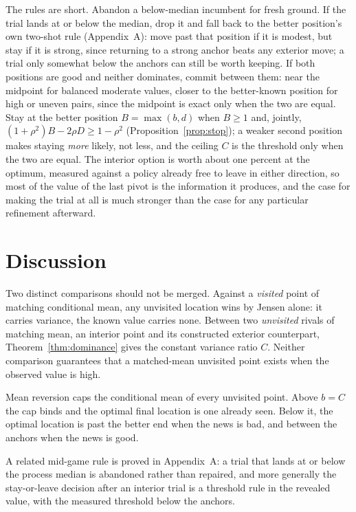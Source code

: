 \documentclass[11pt]{article}
\theoremstyle{itheads}
\begin{document}
The rules are short. Abandon a below-median incumbent for fresh
ground. If the trial lands at or below the median, drop it and fall
back to the better position's own two-shot rule (Appendix~A): move
past that position if it is modest, but stay if it is strong, since
returning to a strong anchor beats any exterior move; a trial only
somewhat below the anchors can still be worth keeping. If both
positions are good and neither dominates, commit between them: near
the midpoint for balanced moderate values, closer to the better-known
position for high or uneven pairs, since the midpoint is exact only
when the two are equal. Stay at the better position $B=\max(b,d)$ when
$B\ge 1$ and, jointly, $(1+\rho^{2})B-2\rho D\ge 1-\rho^{2}$
(Proposition~\ref{prop:stop}); a weaker second position makes staying
\emph{more} likely, not less, and the ceiling $C$ is the threshold
only when the two are equal. The interior option is worth about one percent at the
optimum, measured against a policy already free to leave in either
direction, so most of the value of the last pivot is the information
it produces, and the case for making the trial at all is much
stronger than the case for any particular refinement afterward.

\section{Discussion}

Two distinct comparisons should not be merged. Against a \emph{visited} point of
matching conditional mean, any unvisited location wins by Jensen
alone: it carries variance, the known value carries none. Between two
\emph{unvisited} rivals of matching mean, an interior point and its
constructed exterior counterpart, Theorem~\ref{thm:dominance}
gives the constant variance ratio $C$. Neither comparison
guarantees that a matched-mean unvisited point exists when the
observed value is high.

Mean reversion caps the conditional mean of every unvisited point.
Above $b=C$ the cap binds and the optimal final location
is one already seen. Below it, the optimal location is past the
better end when the news is bad, and between the anchors when the
news is good.

A related mid-game rule is proved in Appendix~A: a trial that lands
at or below the process median is abandoned rather than repaired,
and more generally the stay-or-leave decision after an interior
trial is a threshold rule in the revealed value, with the measured
threshold below the anchors.
\end{document}
